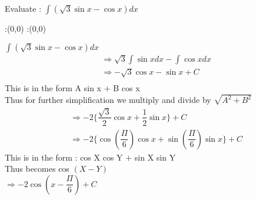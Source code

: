 




\question[4] Evaluate : $\int (\sqrt{3} \sin x - \cos x ) dx $ 


\watchout

\ifprintanswers
  \begin{marginfigure}
      :(0,0)
      :(0,0)
    \figdrawbegin{}
      \figdrawline [100,101]
    \figdrawend
    \figvisu{\figBoxA}{}{%
    }
    \centerline{\box\figBoxA}
  \end{marginfigure}
\fi 

\begin{solution}[\halfpage]
$\int (\sqrt{3} \sin x - \cos x ) dx $\\
\begin{align}
&\Rightarrow \sqrt{3} \int \sin x dx - \int \cos x dx \\
&\Rightarrow - \sqrt{3} \cos x  - \sin x + C\\
\end{align}
This is in the form A sin x $+$ B cos x \\
Thus for further simplification we multiply and divide by $\sqrt{A^2 + B^2}$\\
\begin{align}
&\Rightarrow -2 \lbrace  \dfrac{\sqrt{3}}{2} \cos x + \dfrac{1}{2} \sin x \rbrace + C\\
&\Rightarrow -2 \lbrace  \cos (\dfrac{\Pi}{6}) \cos x + \sin (\dfrac{\Pi}{6}) \sin x \rbrace + C
\end{align}
This is in the form : cos X cos Y $+$ sin X sin Y \\
Thus becomes cos $(X-Y)$\\
$\Rightarrow -2 \cos (x- \dfrac{\Pi}{6}) + C$
\end{solution}


